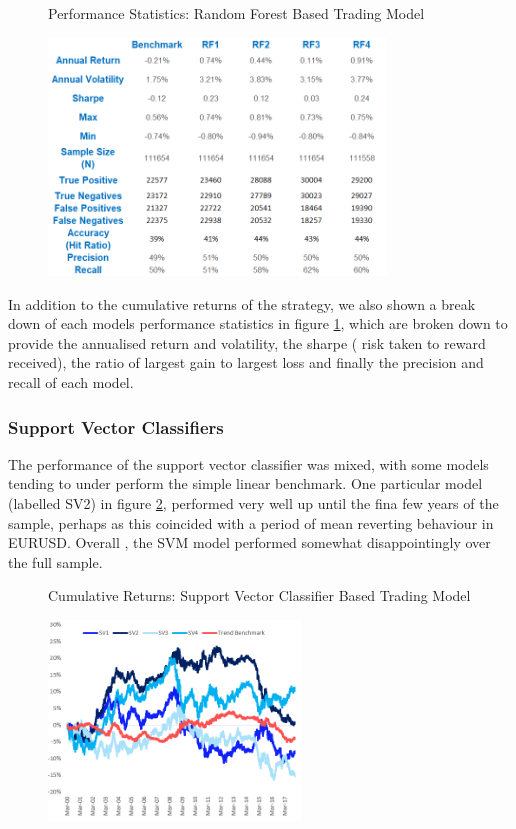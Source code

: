 \documentclass[11pt]{article}
\begin{document}
\begin{figure}[h]
    \centering
	\caption{Performance Statistics: Random Forest Based Trading Model}    
	\includegraphics[width=0.8\textwidth]{RFRandomDataStatsv2}
    \label{fig:RFRandomDataStats}
     \caption*{}
\end{figure}
In addition to the cumulative returns of the strategy, we also shown a break down of each models performance statistics in figure \ref{fig:RFRandomDataStats}, which are broken down to provide the annualised return and volatility, the sharpe ( risk taken to reward received), the ratio of largest gain to largest loss and finally the precision and recall of each model.

\subsubsection{Support Vector Classifiers}
The performance of the support vector classifier was mixed, with some models tending to under perform the simple linear benchmark. One particular model (labelled SV2) in figure \ref{fig:SVMRandomDataResults}, performed very well up until the fina few years of the sample, perhaps as this coincided with a period of mean reverting behaviour in EURUSD. Overall , the SVM model performed somewhat disappointingly over the full sample.
\begin{figure}[h]
    \centering
	\caption{Cumulative Returns: Support Vector Classifier Based Trading Model}    
	\includegraphics[width=0.6\textwidth]{SVMRandomDataResults}
    \label{fig:SVMRandomDataResults}
     \caption*{}
\end{figure}
\end{document}
